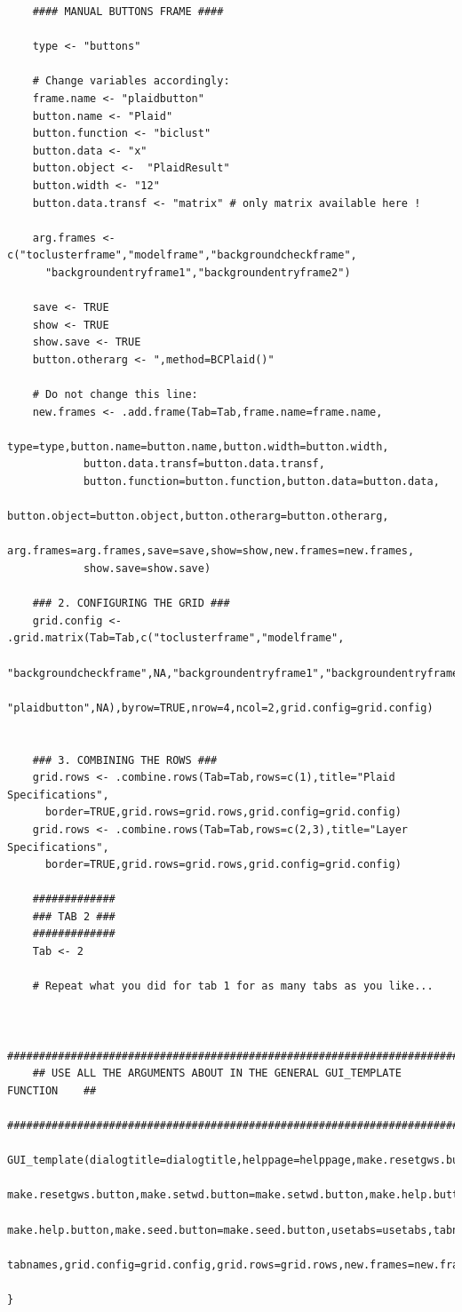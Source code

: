 \documentclass[a4paper]{article}\usepackage[]{graphicx}\usepackage[]{color}
\begin{document}
\begin{verbatim}
	#### MANUAL BUTTONS FRAME ####

	type <- "buttons"
	
	# Change variables accordingly:
	frame.name <- "plaidbutton"  
	button.name <- "Plaid"  
	button.function <- "biclust" 
	button.data <- "x" 
	button.object <-  "PlaidResult" 
	button.width <- "12"
	button.data.transf <- "matrix" # only matrix available here !
	
	arg.frames <- c("toclusterframe","modelframe","backgroundcheckframe",
      "backgroundentryframe1","backgroundentryframe2")
	
	save <- TRUE 
	show <- TRUE
	show.save <- TRUE
	button.otherarg <- ",method=BCPlaid()" 
	
	# Do not change this line: 
	new.frames <- .add.frame(Tab=Tab,frame.name=frame.name,
			type=type,button.name=button.name,button.width=button.width,
			button.data.transf=button.data.transf,
			button.function=button.function,button.data=button.data,
			button.object=button.object,button.otherarg=button.otherarg,
			arg.frames=arg.frames,save=save,show=show,new.frames=new.frames,
            show.save=show.save)
	
	### 2. CONFIGURING THE GRID ###
	grid.config <- .grid.matrix(Tab=Tab,c("toclusterframe","modelframe",
       "backgroundcheckframe",NA,"backgroundentryframe1","backgroundentryframe2",
       "plaidbutton",NA),byrow=TRUE,nrow=4,ncol=2,grid.config=grid.config)
	
	
	### 3. COMBINING THE ROWS ###
	grid.rows <- .combine.rows(Tab=Tab,rows=c(1),title="Plaid Specifications",
      border=TRUE,grid.rows=grid.rows,grid.config=grid.config)
	grid.rows <- .combine.rows(Tab=Tab,rows=c(2,3),title="Layer Specifications",
      border=TRUE,grid.rows=grid.rows,grid.config=grid.config)
	
	#############
	### TAB 2 ###
	#############
	Tab <- 2
	
	# Repeat what you did for tab 1 for as many tabs as you like...
	
	
	#########################################################################
	## USE ALL THE ARGUMENTS ABOUT IN THE GENERAL GUI_TEMPLATE FUNCTION    ##
	#########################################################################
	GUI_template(dialogtitle=dialogtitle,helppage=helppage,make.resetgws.button=
      make.resetgws.button,make.setwd.button=make.setwd.button,make.help.button=
      make.help.button,make.seed.button=make.seed.button,usetabs=usetabs,tabnames=
      tabnames,grid.config=grid.config,grid.rows=grid.rows,new.frames=new.frames)
	
}
\end{verbatim}
\end{document}
